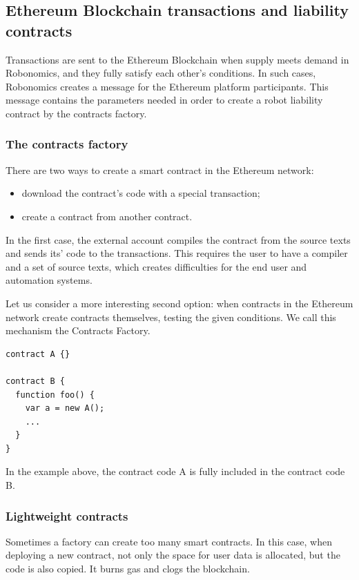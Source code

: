 \documentclass{article}
\begin{document}
\subsection{Ethereum Blockchain transactions and liability contracts}

Transactions are sent to the Ethereum Blockchain when supply meets demand in Robonomics, and they fully satisfy each other’s conditions. In such cases, Robonomics creates a message for the Ethereum platform participants. This message contains the parameters needed in order to create a robot liability contract by the contracts factory.

\subsubsection{The contracts factory}

There are two ways to create a smart contract in the Ethereum network:
\begin{itemize}[noitemsep]
	\item download the contract’s code with a special transaction;
	\item create a contract from another contract.
\end{itemize}

In the first case, the external account compiles the contract from the source texts and sends its’ code to the transactions. This requires the user to have a compiler and a set of source texts, which creates difficulties for the end user and automation systems.

Let us consider a more interesting second option: when contracts in the Ethereum network create contracts themselves, testing the given conditions. We call this mechanism the Contracts Factory.

\begin{lstlisting}
contract A {}

contract B {
  function foo() {
    var a = new A();
    ...
  }
}
\end{lstlisting}

In the example above, the contract code A is fully included in the contract code B.

\subsubsection{Lightweight contracts}

Sometimes a factory can create too many smart contracts. In this case, when deploying a new contract, not only the space for user data is allocated, but the code is also copied. It burns gas and clogs the blockchain.
\end{document}
